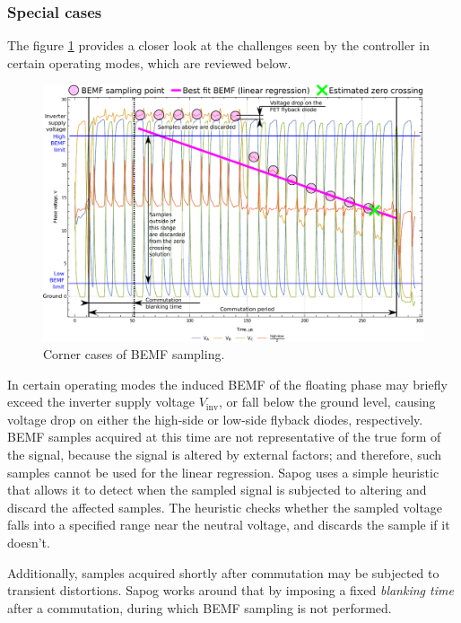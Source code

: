 \documentclass{zubaxdoc}
\begin{document}
\subsubsection{Special cases}

The figure \ref{phase_voltage_sampling_corner_cases} provides a closer look at the challenges
seen by the controller in certain operating modes, which are reviewed below.

\begin{figure}[hbtp]
    \centering
	\includegraphics[width=\textwidth]{phase_voltages_braking_high_advance_angle}
	\caption{Corner cases of BEMF sampling.
	\label{phase_voltage_sampling_corner_cases}}
\end{figure}

In certain operating modes the induced BEMF of the floating phase may briefly exceed the
inverter supply voltage $V_\text{inv}$, or fall below the ground level,
causing voltage drop on either the high-side or low-side flyback diodes, respectively.
BEMF samples acquired at this time are not representative of the true form of the signal,
because the signal is altered by external factors;
and therefore, such samples cannot be used for the linear regression.
Sapog uses a simple heuristic that allows it to detect when the sampled signal is subjected to
altering and discard the affected samples.
The heuristic checks whether the sampled voltage falls into a specified range near the neutral voltage,
and discards the sample if it doesn't.

Additionally, samples acquired shortly after commutation may be subjected to transient distortions.
Sapog works around that by imposing a fixed \emph{blanking time} after a commutation, during which
BEMF sampling is not performed.
\end{document}
